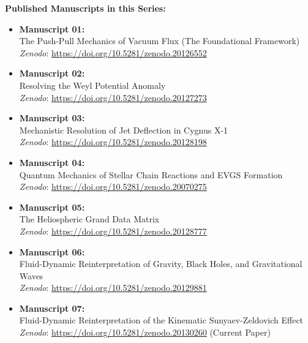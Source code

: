 \documentclass[11pt, a4paper]{article}
\begin{document}
  \vspace{1em}
  \noindent \textbf{Published Manuscripts in this Series:}
  \begin{itemize}
    \item \textbf{Manuscript 01:} \\ The Push-Pull Mechanics of Vacuum Flux (The Foundational Framework) \\ \textit{Zenodo}: \url{https://doi.org/10.5281/zenodo.20126552}
    
    \item \textbf{Manuscript 02:} \\ Resolving the Weyl Potential Anomaly \\ \textit{Zenodo}: \url{https://doi.org/10.5281/zenodo.20127273}

    \item \textbf{Manuscript 03:} \\ Mechanistic Resolution of Jet Deflection in Cygnus X-1 \\ \textit{Zenodo}: \url{https://doi.org/10.5281/zenodo.20128198}

    \item \textbf{Manuscript 04:} \\ Quantum Mechanics of Stellar Chain Reactions and EVGS Formation \\ \textit{Zenodo}: \url{https://doi.org/10.5281/zenodo.20070275}

    \item \textbf{Manuscript 05:} \\ The Heliospheric Grand Data Matrix \\ \textit{Zenodo}: \url{https://doi.org/10.5281/zenodo.20128777}

    \item \textbf{Manuscript 06:} \\ Fluid-Dynamic Reinterpretation of Gravity, Black Holes, and Gravitational Waves \\ \textit{Zenodo}: \url{https://doi.org/10.5281/zenodo.20129881}

    \item \textbf{Manuscript 07:} \\ Fluid-Dynamic Reinterpretation of the Kinematic Sunyaev-Zeldovich Effect \\ \textit{Zenodo}: \url{https://doi.org/10.5281/zenodo.20130260} (Current Paper)
  \end{itemize}
\end{document}
